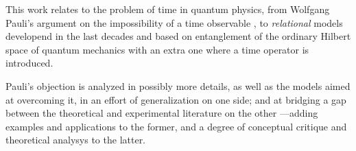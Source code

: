 This work relates to the problem of time in quantum physics,
from Wolfgang Pauli's argument
on the impossibility of a time observable \parencite{PauliFootnote},
to \emph{relational} models developend in the last decades and based
on entanglement of the ordinary Hilbert space of quantum mechanics
with an extra one where a time operator is introduced.

Pauli's objection is analyzed in possibly more details, as well as the models
aimed at overcoming it, in an effort of generalization on one side;
and at bridging a gap between the theoretical
and experimental literature on the other
---adding examples and applications to the former,
and a degree of conceptual critique and theoretical analysys to the latter.
